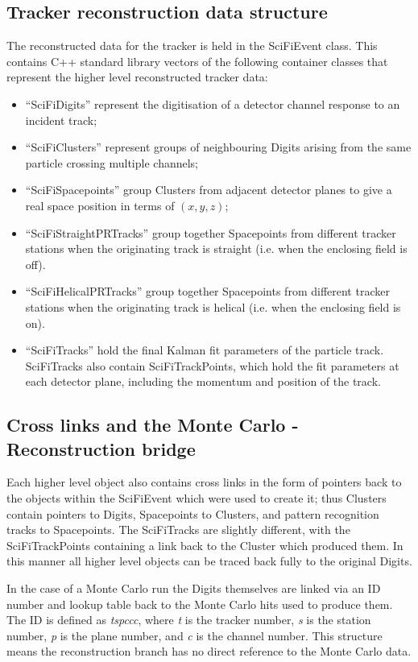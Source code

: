 \subsection{Tracker reconstruction data structure}
\label{subsec:TrackerReconDataStructure}
The reconstructed data for the tracker is held in the SciFiEvent class.  This contains C++ standard library vectors of the following container classes that represent the higher level reconstructed tracker data:
\begin{itemize}
  \item ``SciFiDigits'' represent the digitisation of a detector channel response to an incident track;
  \item ``SciFiClusters'' represent groups of neighbouring Digits arising from the same particle crossing multiple channels;
  \item ``SciFiSpacepoints'' group Clusters from adjacent detector planes to give a real space position in terms of $(x, y, z)$;
  \item ``SciFiStraightPRTracks'' group together Spacepoints from different tracker stations when the originating track is straight (i.e. when the enclosing field is off). %
  \item ``SciFiHelicalPRTracks'' group together Spacepoints from different tracker stations when the originating track is helical (i.e. when the enclosing field is on). %
  \item ``SciFiTracks'' hold the final Kalman fit parameters of the particle track. SciFiTracks also contain SciFiTrackPoints, which hold the fit parameters at each detector plane, including the momentum and position of the track.
\end{itemize}

\subsection{Cross links and the Monte Carlo - Reconstruction bridge}
\label{subsec:CrossLinksAndMCBridge}
Each higher level object also contains cross links in the form of pointers back to the objects within the SciFiEvent which were used to create it; thus Clusters contain pointers to Digits, Spacepoints to Clusters, and pattern recognition tracks to Spacepoints. The SciFiTracks are slightly different, with the SciFiTrackPoints containing a link back to the Cluster which produced them. In this manner all higher level objects can be traced back fully to the original Digits.  

In the case of a Monte Carlo run the Digits themselves are linked via an ID number and lookup table back to the Monte Carlo hits used to produce them. The ID is defined as \textit{tspccc}, where \textit{t} is the tracker number, \textit{s} is the station number, \textit{p} is the plane number, and \textit{c} is the channel number.  This structure means the reconstruction branch has no direct reference to the Monte Carlo data.